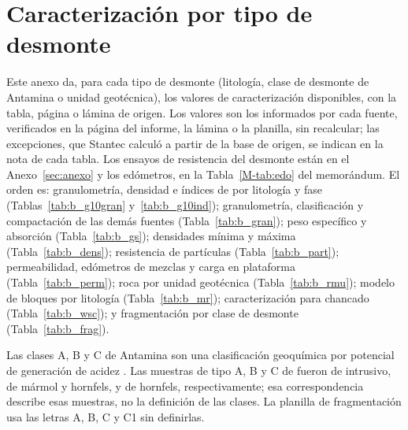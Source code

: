 \documentclass[11pt,letterpaper]{article}
\begin{document}
\section{Caracterización por tipo de desmonte}\label{sec:anexob}
Este anexo da, para cada tipo de desmonte (litología, clase de desmonte de Antamina o unidad geotécnica), los valores de caracterización disponibles, con la tabla, página o lámina de origen. Los valores son los informados por cada fuente, verificados en la página del informe, la lámina o la planilla, sin recalcular; las excepciones, que Stantec calculó a partir de la base de origen, se indican en la nota de cada tabla. Los ensayos de resistencia del desmonte están en el Anexo~\ref{sec:anexo} y los edómetros, en la Tabla~\ref{M-tab:edo} del memorándum. El orden es: granulometría, densidad e índices de \citet{g2010} por litología y fase (Tablas~\ref{tab:b_g10gran} y~\ref{tab:b_g10ind}); granulometría, clasificación y compactación de las demás fuentes (Tabla~\ref{tab:b_gran}); peso específico y absorción (Tabla~\ref{tab:b_gs}); densidades mínima y máxima (Tabla~\ref{tab:b_dens}); resistencia de partículas (Tabla~\ref{tab:b_part}); permeabilidad, edómetros de mezclas y carga en plataforma (Tabla~\ref{tab:b_perm}); roca por unidad geotécnica (Tabla~\ref{tab:b_rmu}); modelo de bloques por litología (Tabla~\ref{tab:b_mr}); caracterización para chancado (Tabla~\ref{tab:b_wsc}); y fragmentación por clase de desmonte (Tabla~\ref{tab:b_frag}).

Las clases A, B y C de Antamina son una clasificación geoquímica por potencial de generación de acidez \citep[pp.~6 y~27]{g2021}. Las muestras de tipo A, B y C de \citet{g2021} fueron de intrusivo, de mármol y hornfels, y de hornfels, respectivamente; esa correspondencia describe esas muestras, no la definición de las clases. La planilla de fragmentación \citep{antamina2025frag} usa las letras A, B, C y C1 sin definirlas.
\end{document}
